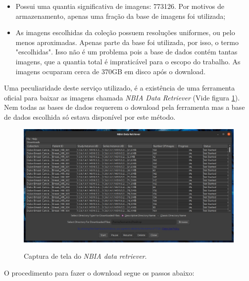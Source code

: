 \begin{itemize}
    \item Possui uma quantia significativa de imagens: 773126. Por motivos de armazenamento, apenas uma fração da base de imagens foi utilizada;
    \item As imagens escolhidas da coleção possuem resoluções uniformes, ou pelo menos aproximadas. Apenas parte da base foi utilizada, por isso, o termo "escolhidas". Isso não é um problema pois a base de dados contém tantas imagens, que a quantia total é impraticável para o escopo do trabalho. As imagens ocuparam cerca de 370GB em disco após o download. 
    
\end{itemize}

Uma peculiaridade deste serviço utilizado, é a existência de uma ferramenta oficial para baixar as imagens chamada \textit{NBIA Data Retriever} \cite{cancer_imaging_archive_cancer_2022}(Vide figura \ref{fig:fig15}). Nem todas as bases de dados requerem o download pela ferramenta mas a base de dados escolhida só estava disponível por este método.

\begin{figure}[H]
    \centering
    \caption{Captura de tela do \textit{NBIA data retriever}.}
    \includegraphics[width=13cm]{fig/nbia_data_retriever.png}
    \label{fig:fig15}
\end{figure}

O procedimento para fazer o download segue os passos abaixo:


